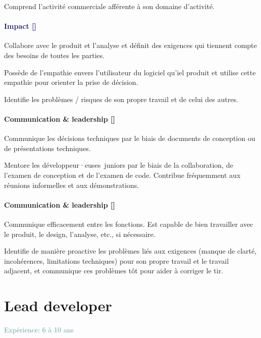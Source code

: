 \documentclass[a4paper, french, openany, 12pt]{book}
\newcommand\wis{\textcolor{MidnightBlue}{\textbf{Impact [\bsc{WIS}]}}}
\newcommand\cha{\textcolor{RawSienna}{\textbf{Communication \& leadership [\bsc{CHA}]}}}
\newcommand\xp[1]{\textcolor{CadetBlue}{Expérience: {#1} ans}}
\newcommand\devs{développeur·euses}
\begin{document}
\begin{multicols}{2}
  Comprend l'activité commerciale afférente à son domaine d'activité.

  \subsubsection*{\wis}

  Collabore avec le produit et l'analyse et définit des exigences qui tiennent compte des besoins de toutes les parties.

  Possède de l'empathie envers l'utilisateur du logiciel qu'iel produit et utilise cette empathie pour orienter la prise 
  de décision.

  Identifie les problèmes / risques de son propre travail et de celui des autres.

  \subsubsection*{\cha}

  Communique les décisions techniques par le biais de documents de conception ou de présentations techniques.

  Mentore les \devs\ juniors par le biais de la collaboration, de l'examen de conception et de l'examen de code. 
  Contribue fréquemment aux réunions informelles et aux démonstrations.

  \subsubsection*{\cha}

  Communique efficacement entre les fonctions.
  Est capable de bien travailler avec le produit, le design, l'analyse, etc., si nécessaire.

  Identifie de manière proactive les problèmes liés aux exigences (manque de clarté, incohérences, limitations techniques)
  pour son propre travail et le travail adjacent, et communique ces problèmes tôt pour aider à corriger le tir.

\end{multicols}


\chapter{Lead developer}

\xp{6 à 10}
\end{document}
